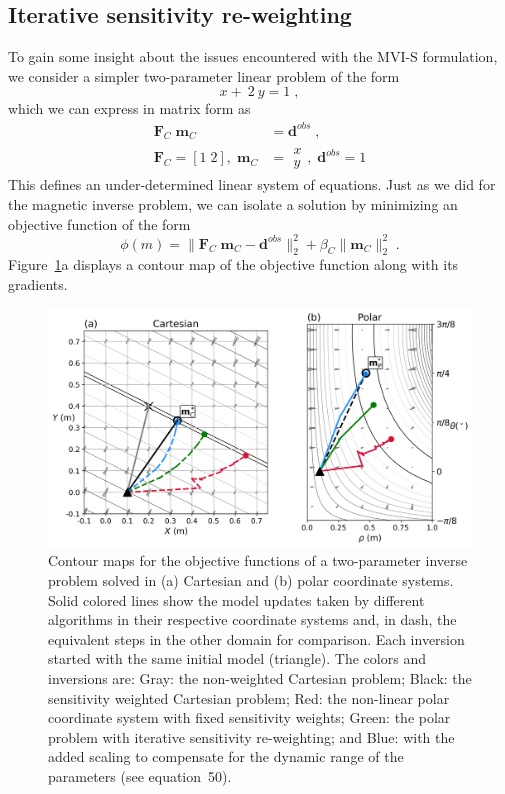 \documentclass[paper]{geophysics}
\begin{document}
\subsection{Iterative sensitivity re-weighting}
To gain some insight about the issues encountered with the MVI-S formulation, we consider a simpler two-parameter linear problem of the form
\begin{equation}
x + \:2\:y =1 \;,
\end{equation}
which we can express in matrix form as
\begin{equation}\label{twoParam}
\begin{split}
\mathbf{F}_C\;\mathbf{m}_C &= \mathbf{d}^{obs} \;,\\
\mathbf{F}_C = [1\;2], \;
\mathbf{m}_C &=
\begin{matrix}
x\\
y
\end{matrix}, \;
\mathbf{d}^{obs} = 1
\end{split}
\end{equation}
This defines an under-determined linear system of equations. Just as we did for the magnetic inverse problem, we can isolate a solution by minimizing an objective function of the form
\begin{equation}\label{toyProblem}
\phi(m) = \| \mathbf{F}_C\;\mathbf{m}_C - \mathbf{d}^{obs} \|_2^2 + \beta_C \| \mathbf{m}_C \|_2^2 \;.
\end{equation}
Figure~\ref{NonLinearGN}a displays a contour map of the objective function along with its gradients.

\begin{figure}[p!]
\includegraphics[width=\columnwidth]{Figures/Figure5.png}
\caption{Contour maps for the objective functions of a two-parameter inverse problem solved in (a) Cartesian and (b) polar coordinate systems. Solid colored lines show the model updates taken by different algorithms in their respective coordinate systems and, in dash, the equivalent steps in the other domain for comparison. Each inversion started with the same initial model (triangle). The colors and inversions are: Gray: the non-weighted Cartesian problem; Black: the sensitivity weighted Cartesian problem; Red: the non-linear polar coordinate system with fixed sensitivity weights; Green: the polar problem with iterative sensitivity re-weighting; and Blue: with the added scaling to compensate for the dynamic range of the parameters (see equation~50). }
\label{NonLinearGN}
\end{figure}
\end{document}
